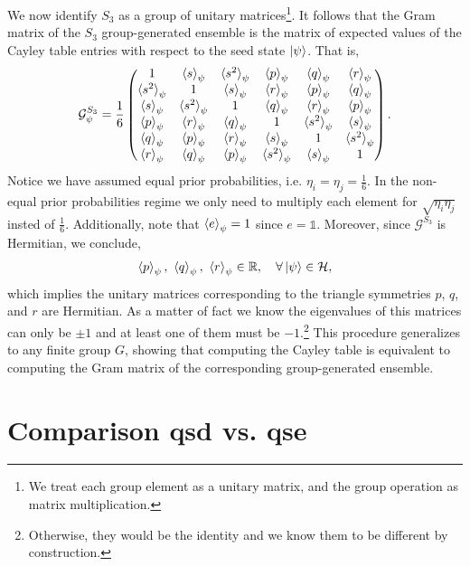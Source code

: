 \documentclass[12pt,letterpaper]{article}
\begin{document}
We now identify $S_3$ as a group of unitary matrices\footnote{We treat each group element as a unitary matrix, and the group operation as matrix multiplication.}. It follows that the Gram matrix of the $S_3$ group-generated ensemble is the matrix of expected values of the Cayley table entries with respect to the seed state $\ket{\psi}$. That is,
\begin{align*}
	\mathcal{G}^{S_3}_{\psi} = \frac{1}{6}\begin{pmatrix}
        1 & \braket{s}_\psi & \braket{s^2}_\psi & \braket{p}_\psi & \braket{q}_\psi & \braket{r}_\psi \\ 
        \braket{s^2}_\psi & 1 & \braket{s}_\psi & \braket{r}_\psi & \braket{p}_\psi & \braket{q}_\psi \\
        \braket{s}_\psi & \braket{s^2}_\psi & 1 & \braket{q}_\psi & \braket{r}_\psi & \braket{p}_\psi \\
        \braket{p}_\psi & \braket{r}_\psi & \braket{q}_\psi & 1 & \braket{s^2}_\psi & \braket{s}_\psi \\
        \braket{q}_\psi & \braket{p}_\psi & \braket{r}_\psi & \braket{s}_\psi & 1 & \braket{s^2}_\psi \\
        \braket{r}_\psi & \braket{q}_\psi & \braket{p}_\psi & \braket{s^2}_\psi & \braket{s}_\psi & 1
	\end{pmatrix}.
\end{align*}
Notice we have assumed equal prior probabilities, i.e. $\eta_i = \eta_j = \frac{1}{6}$. In the non-equal prior probabilities regime we only need to multiply each element for $\sqrt{\eta_i\eta_j}$ insted of $\frac{1}{6}$. Additionally, note that $\braket{e}_\psi = 1$ since $e = \mathds{1}$. Moreover, since $\mathcal{G}^{S_3}$ is Hermitian, we conclude,
\begin{align*}
\braket{p}_{\psi},\ \braket{q}_{\psi},\ \braket{r}_{\psi} \in \mathbb{R}, \quad \forall \ket{\psi} \in \mathcal{H},
\end{align*}
which implies the unitary matrices corresponding to the triangle symmetries $p$, $q$, and $r$ are Hermitian. As a matter of fact we know the eigenvalues of this matrices can only be $\pm 1$ and at least one of them must be $-1$.\footnote{Otherwise, they would be the identity and we know them to be different by construction.} This procedure generalizes to any finite group $G$, showing that computing the Cayley table is equivalent to computing the Gram matrix of the corresponding group-generated ensemble.

\section{Comparison \gls{qsd} vs. \gls{qse}}\label{appendixComparisonQSDvsQSE}
\end{document}
